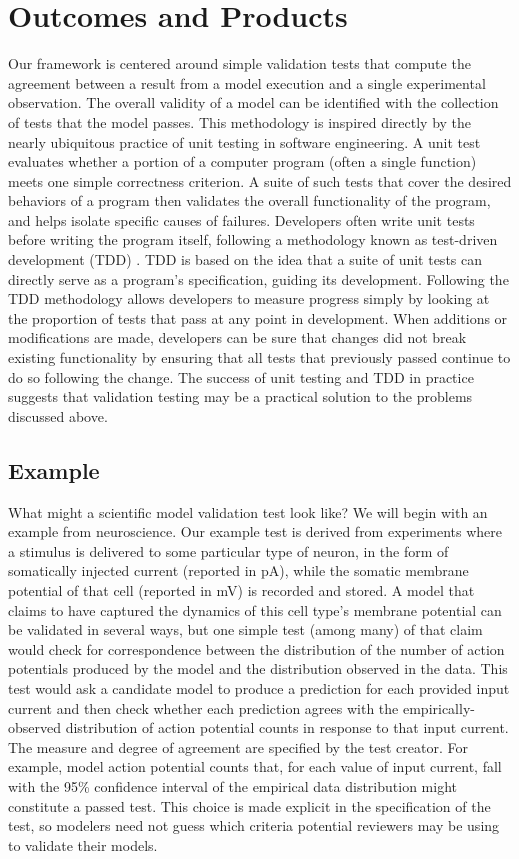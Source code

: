 \documentclass[11pt,letterpaper]{article}
\begin{document}
\section{Outcomes and Products}
Our framework is centered around simple validation tests that compute the agreement between a result from a model execution and a single experimental observation. The overall validity of a model can be identified with the collection of tests that the model passes. This methodology is inspired directly by the nearly ubiquitous practice of unit testing in software engineering. A unit test evaluates whether a portion of a computer program (often a single function) meets one simple correctness criterion. A suite of such tests that cover the desired behaviors of a program then validates the overall functionality of the program, and helps isolate specific causes of failures. Developers often write unit tests before writing the program itself, following a methodology known as test-driven development (TDD) \cite{beck2002}. TDD is based on the idea that a suite of unit tests can directly serve as a program's specification, guiding its development. Following the TDD methodology allows developers to measure progress simply by looking at the proportion of tests that pass at any point in development. When additions or modifications are made, developers can be sure that changes did not break existing functionality by ensuring that all tests that previously passed continue to do so following the change. The success of unit testing and TDD in practice suggests that validation testing may be a practical solution to the problems discussed above. 

\subsection{Example} What might a scientific model validation test look like?  We will begin with an example from neuroscience. Our example test is derived from experiments where a stimulus is delivered to some particular type of neuron, in the form of somatically injected current (reported in pA), while the somatic membrane potential of that cell (reported in mV) is recorded and stored.  A model that claims to have captured the dynamics of this cell type's membrane potential can be validated in several ways, but one simple test (among many) of that claim would check for correspondence between the distribution of the number of action potentials produced by the model and the distribution observed in the data. This test would ask a candidate model to produce a prediction for each provided input current and then check whether each prediction agrees with the empirically-observed distribution of action potential counts in response to that input current.  The measure and degree of agreement are specified by the test creator.  For example, model action potential counts that, for each value of input current, fall with the 95\% confidence interval of the empirical data distribution might constitute a passed test. This choice is made explicit in the specification of the test, so modelers need not guess which criteria potential reviewers may be using to validate their models.
\end{document}
